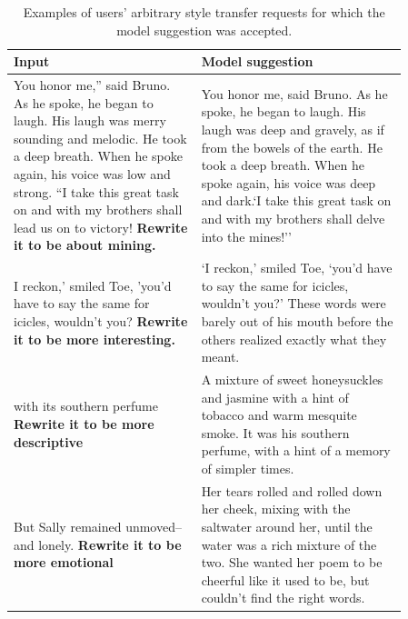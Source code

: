 \begin{table}[ht]
    \caption{Examples of users' arbitrary style transfer requests for which the model suggestion was accepted.}
    \label{tab:selected_usage_examples}
    \small
    \centering
    \def\arraystretch{1.5}%
    \begin{tabular}{p{0.41\linewidth} p{0.45\linewidth}}
    \toprule
      \textbf{Input} & \textbf{Model suggestion} \\ \midrule
      You honor me,'' said Bruno. As he spoke, he began to laugh. His laugh was merry sounding and melodic. He took a deep breath. When he spoke again, his voice was low and strong. ``I take this great task on and with my brothers shall lead us on to victory! \newline \textbf{Rewrite it to be about mining.} & You honor me, said Bruno. As he spoke, he began to laugh. His laugh was deep and gravely, as if from the bowels of the earth. He took a deep breath. When he spoke again, his voice was deep and dark.`I take this great task on and with my brothers shall delve into the mines!'' \\ \midrule
      I reckon,' smiled Toe, 'you'd have to say the same for icicles, wouldn't you? \newline \textbf{Rewrite it to be more interesting.} & ‘I reckon,’ smiled Toe, ‘you’d have to say the same for icicles, wouldn’t you?’ These words were barely out of his mouth before the others realized exactly what they meant.\\ \midrule
      with its southern perfume \newline \textbf{Rewrite it to be more descriptive} & A mixture of sweet honeysuckles and jasmine  with  a  hint  of  tobacco  and warm mesquite smoke. It was his southern perfume, with a hint of a memory of simpler times.\\ \midrule
      But Sally remained unmoved--and lonely. \newline \textbf{Rewrite it to be more emotional} & Her tears rolled and rolled down her cheek, mixing with the saltwater around her, until the water was a rich mixture of the two. She wanted her poem to be cheerful like it used to be, but couldn't find the right words. \\
    \bottomrule
    \end{tabular}
\end{table}

